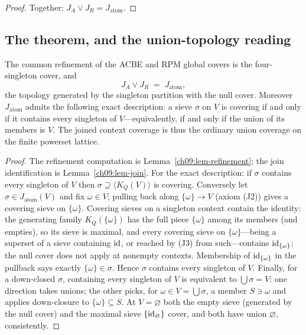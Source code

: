\begin{proof}
Together: $J_{A}\vee J_{R}=J_{\mathrm{atom}}$.
\end{proof}

\subsection{The theorem, and the union-topology reading}

\begin{theorem}\label{ch09:thm-nt24}
The common refinement of the ACBE and RPM global covers is the four-singleton cover, and
\[
J_{A}\vee J_{R}\;=\;J_{\mathrm{atom}},
\]
the topology generated by the singleton partition with the null cover. Moreover $J_{\mathrm{atom}}$ admits the following exact description: a sieve $\sigma$ on $V$ is covering if and only if it contains every singleton of $V$---equivalently, if and only if the union of its members is $V$. The joined context coverage is thus the ordinary union coverage on the finite powerset lattice.
\end{theorem}

\begin{proof}
The refinement computation is Lemma~\ref{ch09:lem-refinement}; the join identification is Lemma~\ref{ch09:lem-join}. For the exact description: if $\sigma$ contains every singleton of $V$ then $\sigma\supseteq\langle K_{Q}(V)\rangle$ is covering. Conversely let $\sigma\in J_{\mathrm{atom}}(V)$ and fix $\omega\in V$; pulling back along $\{\omega\}\to V$ (axiom (J2)) gives a covering sieve on $\{\omega\}$. Covering sieves on a singleton context contain the identity: the generating family $K_{Q}(\{\omega\})$ has the full piece $\{\omega\}$ among its members (and empties), so its sieve is maximal, and every covering sieve on $\{\omega\}$---being a superset of a sieve containing $\mathrm{id}$, or reached by (J3) from such---contains $\mathrm{id}_{\{\omega\}}$; the null cover does not apply at nonempty contexts. Membership of $\mathrm{id}_{\{\omega\}}$ in the pullback says exactly $\{\omega\}\in\sigma$. Hence $\sigma$ contains every singleton of $V$. Finally, for a down-closed $\sigma$, containing every singleton of $V$ is equivalent to $\bigcup\sigma=V$: one direction takes unions; the other picks, for $\omega\in V=\bigcup\sigma$, a member $S\ni\omega$ and applies down-closure to $\{\omega\}\subseteq S$. At $V=\varnothing$ both the empty sieve (generated by the null cover) and the maximal sieve $\{\mathrm{id}_{\varnothing}\}$ cover, and both have union $\varnothing$, consistently.
\end{proof}

